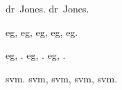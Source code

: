 \documentclass{article}
\begin{document}
\gls{dr}~Jones.
\gls{dr}~Jones.

\Gls{eg}, \gls{eg}, \acrshort{eg}, \acrlong{eg}, \acrfull{eg}.

\Acrshort{eg}, . \Acrlong{eg}, .
\Acrfull{eg}, .

\gls{svm}. \gls{svm}, \acrshort{svm}, \acrlong{svm}, \acrfull{svm}.

\printglossaries
\end{document}

